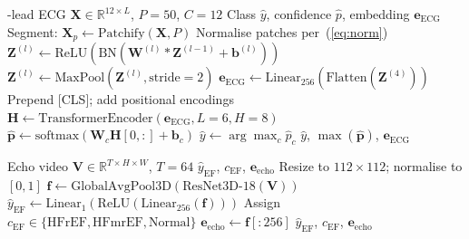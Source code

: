 \documentclass[AMA,STIX1COL,]{WileyNJD-v2}
\begin{document}
\begin{algorithm}[!t]
\caption{1D-CNN Transformer ECG Encoder}
\label{alg:ecg}
\begin{algorithmic}[1]
-lead ECG $\mathbf{X}\!\in\!\mathbb{R}^{12\times L}$,
         $P\!=\!50$, $C\!=\!12$
\Ensure Class $\hat{y}$, confidence $\hat{p}$,
        embedding $\mathbf{e}_{\mathrm{ECG}}$
\State Segment: $\mathbf{X}_p\leftarrow\mathrm{Patchify}(\mathbf{X},P)$
\State Normalise patches per~(\ref{eq:norm})
  \State $\mathbf{Z}^{(l)}\leftarrow
    \mathrm{ReLU}(\mathrm{BN}(\mathbf{W}^{(l)}*\mathbf{Z}^{(l-1)}
    +\mathbf{b}^{(l)}))$
  \State $\mathbf{Z}^{(l)}\leftarrow
    \mathrm{MaxPool}(\mathbf{Z}^{(l)},\mathrm{stride}=2)$
\EndFor
\State $\mathbf{e}_{\mathrm{ECG}}\leftarrow
  \mathrm{Linear}_{256}(\mathrm{Flatten}(\mathbf{Z}^{(4)}))$
\State Prepend [CLS]; add positional encodings
\State $\mathbf{H}\leftarrow
  \mathrm{TransformerEncoder}(\mathbf{e}_{\mathrm{ECG}},L\!=\!6,H\!=\!8)$
\State $\hat{\mathbf{p}}\leftarrow
  \mathrm{softmax}(\mathbf{W}_c\mathbf{H}[0,:]+\mathbf{b}_c)$
\State $\hat{y}\leftarrow\arg\max_c\hat{p}_c$
\State \Return $\hat{y}$, $\max(\hat{\mathbf{p}})$, $\mathbf{e}_{\mathrm{ECG}}$
\end{algorithmic}
\end{algorithm}

\begin{algorithm}[!t]
\caption{EchoNet 3D-CNN LVEF Estimation}
\label{alg:echo}
\begin{algorithmic}[1]
\Require Echo video $\mathbf{V}\!\in\!\mathbb{R}^{T\times H\times W}$,
         $T\!=\!64$
\Ensure $\hat{y}_{\mathrm{EF}}$, $c_{\mathrm{EF}}$,
        $\mathbf{e}_{\mathrm{echo}}$
\State Resize to $112\times112$; normalise to $[0,1]$
\State $\mathbf{f}\leftarrow
  \mathrm{GlobalAvgPool3D}(\mathrm{ResNet3D\text{-}18}(\mathbf{V}))$
\State $\hat{y}_{\mathrm{EF}}\leftarrow
  \mathrm{Linear}_1(\mathrm{ReLU}(\mathrm{Linear}_{256}(\mathbf{f})))$
\State Assign $c_{\mathrm{EF}}\in\{\mathrm{HFrEF,HFmrEF,Normal}\}$
\State $\mathbf{e}_{\mathrm{echo}}\leftarrow\mathbf{f}[:256]$
\State \Return $\hat{y}_{\mathrm{EF}}$, $c_{\mathrm{EF}}$,
        $\mathbf{e}_{\mathrm{echo}}$
\end{algorithmic}
\end{algorithm}
\end{document}
